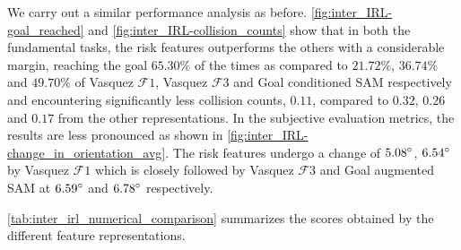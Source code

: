 We carry out a similar performance analysis as before. \autoref{fig:inter_IRL-goal_reached} and \autoref{fig:inter_IRL-collision_counts} show that in both the fundamental tasks, the risk features outperforms the others with a considerable margin, reaching the goal $65.30\%$ of the times as compared to $21.72\%$, $36.74\%$ and $49.70\%$ of Vasquez $\mathcal{F}1$, Vasquez $\mathcal{F}3$ and Goal conditioned SAM respectively and encountering significantly less collision counts, $0.11$, compared to $0.32$, $0.26$ and $0.17$ from the other  representations. In the subjective evaluation metrics, the results are less pronounced as shown in \autoref{fig:inter_IRL-change_in_orientation_avg}. The risk features undergo a change of $5.08\degree$, $6.54\degree$  by Vasquez $\mathcal{F}1$ which is closely followed by Vasquez $\mathcal{F}3$ and Goal augmented SAM at $6.59\degree$ and $6.78\degree$ respectively. 
\par
{}%
 \autoref{tab:inter_irl_numerical_comparison} summarizes the scores obtained by the different feature representations.
